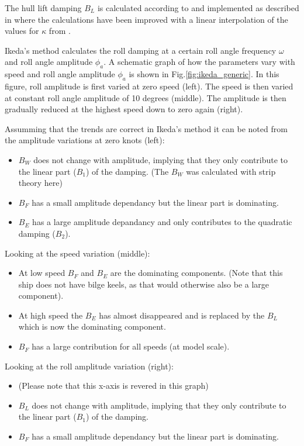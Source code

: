 \quad The hull lift damping $B_L$ is calculated according to
\citep{7505983/937PN5DT} and implemented as described in
\citep{7505983/UYUAYY7E} where the calculations have been improved with a
linear interpolation of the values for $\kappa$ from
\citep{7505983/937PN5DT}.

\quad Ikeda's method calculates the roll damping at a certain roll angle
frequency $\omega$ and roll angle amplitude $\phi_a$. A schematic
graph of how the parameters vary with speed and roll angle amplitude
$\phi_a$ is shown in Fig.\ref{fig:ikeda_generic}. In this
figure, roll amplitude is first varied at zero speed (left). The speed
is then varied at constant roll angle amplitude of 10 degrees (middle).
The amplitude is then gradually reduced at the highest speed down to
zero again (right).

\quad Assumming that the trends are correct in Ikeda's method it can be
noted from the amplitude variations at zero knots (left):

\begin{itemize}
\item $B_W$ does not change with amplitude, implying that they only contribute to the linear part ($B_1$) of the damping. (The $B_W$ was calculated with strip theory here)
\item $B_F$ has a small amplitude dependancy but the linear part is dominating.
\item $B_E$ has a large amplitude depandancy and only contributes to the quadratic damping ($B_2$)\citep{7505983/4AFVVGNT}.
\end{itemize}

\quad Looking at the speed variation (middle):

\begin{itemize}
\item At low speed $B_F$ and $B_E$ are the dominating components. (Note that this ship does not have bilge keels, as that would otherwise also be a large component).
\item At high speed the $B_E$ has almost disappeared and is replaced by the $B_L$ which is now the dominating component.
\item $B_F$ has a large contribution for all speeds (at model scale).
\end{itemize}

\quad Looking at the roll amplitude variation (right):

\begin{itemize}
\item (Please note that this x-axis is revered in this graph)
\item $B_L$ does not change with amplitude, implying that they only contribute to the linear part ($B_1$) of the damping.
\item $B_F$ has a small amplitude dependancy but the linear part is dominating.
\end{itemize}

